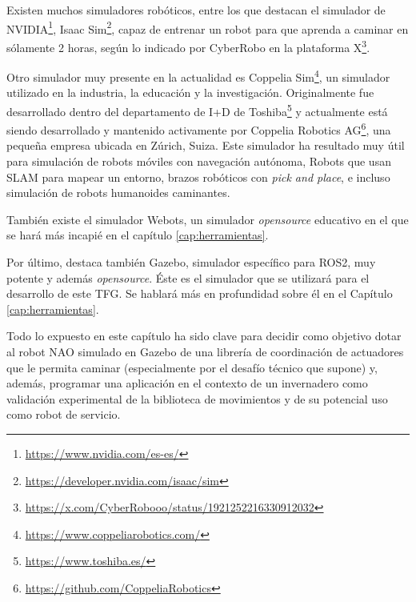 Existen muchos simuladores robóticos, entre los que destacan el simulador de NVIDIA\footnote{\url{https://www.nvidia.com/es-es/}}, Isaac Sim\footnote{\url{https://developer.nvidia.com/isaac/sim}}, capaz de entrenar un robot para que aprenda a caminar en sólamente 2 horas, según lo indicado por CyberRobo en la plataforma X\footnote{\url{https://x.com/CyberRobooo/status/1921252216330912032}}. 

Otro simulador muy presente en la actualidad es Coppelia Sim\footnote{\url{https://www.coppeliarobotics.com/}}, un simulador utilizado en la industria, la educación y la investigación. Originalmente fue desarrollado dentro del departamento de I+D de Toshiba\footnote{\url{https://www.toshiba.es/}} y actualmente está siendo desarrollado y mantenido activamente por Coppelia Robotics AG\footnote{\url{https://github.com/CoppeliaRobotics}}, una pequeña empresa ubicada en Zúrich, Suiza. Este simulador ha resultado muy útil para simulación de robots móviles con navegación autónoma, Robots que usan SLAM para mapear un entorno, brazos robóticos con \textit{pick and place}, e incluso simulación de robots humanoides caminantes.

También existe el simulador Webots, un simulador \textit{opensource} educativo en el que se hará más incapié en el capítulo \ref{cap:herramientas}.

Por último, destaca también Gazebo, simulador específico para ROS2, muy potente y además \textit{opensource}. Éste es el simulador que se utilizará para el desarrollo de este TFG. Se hablará más en profundidad sobre él en el Capítulo \ref{cap:herramientas}.

Todo lo expuesto en este capítulo ha sido clave para decidir como objetivo dotar al robot NAO simulado en Gazebo de una librería de coordinación de actuadores que le permita caminar (especialmente por el desafío técnico que supone) y, además, programar una aplicación en el contexto de un invernadero como validación experimental de la biblioteca de movimientos y de su potencial uso como robot de servicio.